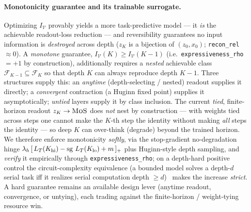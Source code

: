 \documentclass[11pt]{article}
\newcommand{\sg}{\operatorname{sg}}
\newcommand{\code}[1]{\texttt{#1}}
\begin{document}
\paragraph{Monotonicity guarantee and its trainable surrogate.}
Optimizing \(I_{\mathcal V}\) provably yields a more task-predictive model --- it \emph{is} the achievable
readout-loss reduction --- and reversibility guarantees no input information is \emph{destroyed} across
depth (\(z_K\) is a bijection of \((z_0,x_0)\); \code{recon\_rel}\(\approx0\)).  A \emph{monotone}
guarantee, \(I_{\mathcal V}(K)\ge I_{\mathcal V}(K{-}1)\) (i.e.\ \code{expressiveness\_rho}\(=+1\) by
construction), additionally requires a \emph{nested} achievable class
\(\mathcal F_{K-1}\subseteq\mathcal F_{K}\) so that depth \(K\) can always reproduce depth \(K{-}1\).
Three structures supply this: an \emph{anytime} (depth-selecting / nested) readout supplies it directly;
a \emph{convergent} contraction (a Huginn fixed point) supplies it asymptotically; \emph{untied} layers
supply it by class inclusion.  The current \emph{tied}, finite-horizon readout \(z_K\to\textsc{MoS}\)
does \emph{not} nest by construction --- with weights tied across steps one cannot make the \(K\)-th step
the identity without making \emph{all} steps the identity --- so deep \(K\) can over-think (degrade)
beyond the trained horizon.  We therefore enforce monotonicity \emph{softly}, via the stop-gradient
no-degradation hinge \(\lambda_h\,[\,L_T(K_{\rm hi})-\sg\,L_T(K_{\rm lo})+m\,]_+\) plus Huginn-style depth
sampling, and \emph{verify} it empirically through \code{expressiveness\_rho}; on a depth-hard positive
control the circuit-complexity equivalence (a bounded model solves a depth-\(d\) serial task iff it
realizes serial computation depth \(\ge d\))~\cite{cot} makes the increase \emph{strict}.  A hard
guarantee remains an available design lever (anytime readout, convergence, or untying), each trading
against the finite-horizon / weight-tying resource win.
\end{document}
